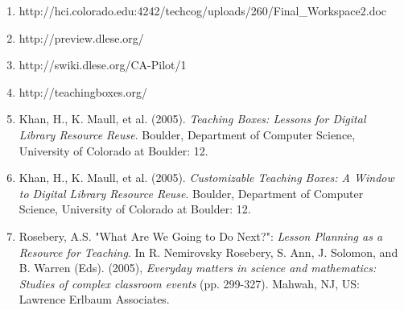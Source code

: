 \begin{enumerate}
	\item http://hci.colorado.edu:4242/techcog/uploads/260/Final\_Workspace2.doc

	\item http://preview.dlese.org/

	\item http://swiki.dlese.org/CA-Pilot/1

	\item http://teachingboxes.org/

	\item Khan, H., K. Maull, et al. (2005). \textit{Teaching Boxes: Lessons for
		Digital Library Resource Reuse}. Boulder, Department of Computer
		Science, University of Colorado at Boulder: 12.

	\item Khan, H., K. Maull, et al. (2005). \textit{Customizable Teaching
		Boxes: A Window to Digital Library Resource Reuse}. Boulder, Department
		of Computer Science, University of Colorado at Boulder: 12.

	\item Rosebery, A.S. "What Are We Going to Do Next?": \textit{Lesson
		Planning as a Resource for Teaching}.  In R. Nemirovsky Rosebery, S.
		Ann, J. Solomon, and B. Warren (Eds). (2005), \textit{Everyday matters
		in science and mathematics: Studies of complex classroom events} (pp.
		299-327). Mahwah, NJ, US: Lawrence Erlbaum Associates.

\end{enumerate}

